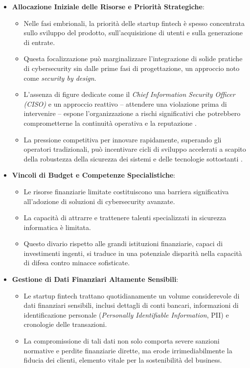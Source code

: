 \begin{itemize}
    \item \textbf{Allocazione Iniziale delle Risorse e Priorità Strategiche}: 
    \begin{itemize}
        \item Nelle fasi embrionali, la priorità delle startup fintech è spesso concentrata sullo sviluppo del prodotto, sull'acquisizione di utenti e sulla generazione di entrate.
        \item Questa focalizzazione può marginalizzare l'integrazione di solide pratiche di cybersecurity sin dalle prime fasi di progettazione, un approccio noto come \textit{security by design}.
        \item L'assenza di figure dedicate come il \textit{Chief Information Security Officer (CISO)} e un approccio reattivo – attendere una violazione prima di intervenire – espone l'organizzazione a rischi significativi che potrebbero comprometterne la continuità operativa e la reputazione \cite{Kaur2021}.
        \item La pressione competitiva per innovare rapidamente, superando gli operatori tradizionali, può incentivare cicli di sviluppo accelerati a scapito della robustezza della sicurezza dei sistemi e delle tecnologie sottostanti \cite{teppoKauppinenRiskAndSecurityManagementInSaaSStartup_2024}.
    \end{itemize}
    
    \item \textbf{Vincoli di Budget e Competenze Specialistiche}:
    \begin{itemize}
        \item Le risorse finanziarie limitate costituiscono una barriera significativa all'adozione di soluzioni di cybersecurity avanzate.
        \item La capacità di attrarre e trattenere talenti specializzati in sicurezza informatica è limitata.
        \item Questo divario rispetto alle grandi istituzioni finanziarie, capaci di investimenti ingenti, si traduce in una potenziale disparità nella capacità di difesa contro minacce sofisticate.
    \end{itemize}
    
    \item \textbf{Gestione di Dati Finanziari Altamente Sensibili}:
    \begin{itemize}
        \item Le startup fintech trattano quotidianamente un volume considerevole di dati finanziari sensibili, inclusi dettagli di conti bancari, informazioni di identificazione personale (\textit{Personally Identifiable Information}, PII) e cronologie delle transazioni.
        \item La compromissione di tali dati non solo comporta severe sanzioni normative e perdite finanziarie dirette, ma erode irrimediabilmente la fiducia dei clienti, elemento vitale per la sostenibilità del business.
    \end{itemize}
    

\end{itemize}
